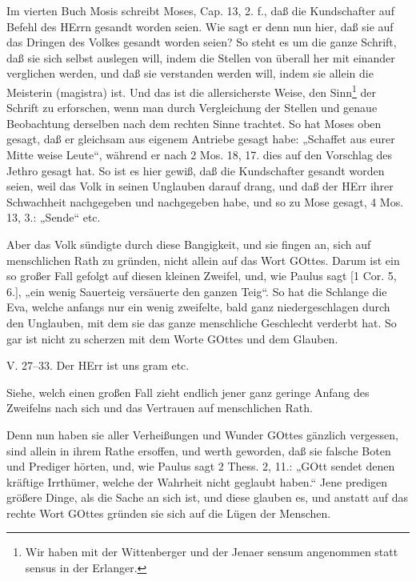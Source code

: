 Im vierten Buch Mosis schreibt Moses, Cap. 13, 2. f., daß die Kundschafter auf Befehl des HErrn gesandt worden seien. Wie sagt er denn nun hier, daß sie auf das Dringen des Volkes gesandt worden seien? So steht es um die ganze Schrift, daß sie sich selbst auslegen will, indem die Stellen von überall her mit einander verglichen werden, und daß sie verstanden werden will, indem sie allein die Meisterin (magistra) ist. Und das ist die allersicherste Weise, den Sinn\footnote{Wir haben mit der Wittenberger und der Jenaer sensum angenommen statt sensus in der Erlanger.} der Schrift zu erforschen, wenn man durch Vergleichung der Stellen und genaue Beobachtung derselben nach dem rechten Sinne trachtet. So hat Moses oben gesagt, daß er gleichsam aus eigenem Antriebe gesagt habe: „Schaffet aus eurer Mitte weise Leute“, während er nach 2 Mos. 18, 17. dies auf den Vorschlag des Jethro gesagt hat. So ist es hier gewiß, daß die Kundschafter gesandt worden seien, weil das Volk in seinen Unglauben darauf drang, und daß der HErr ihrer Schwachheit nachgegeben und nachgegeben habe, und so zu Mose gesagt, 4 Mos. 13, 3.: „Sende“ etc.

Aber das Volk sündigte durch diese Bangigkeit, und sie fingen an, sich auf menschlichen Rath zu gründen, nicht allein auf das Wort GOttes. Darum ist ein so großer Fall gefolgt auf diesen kleinen Zweifel, und, wie Paulus sagt [1 Cor. 5, 6.], „ein wenig Sauerteig versäuerte den ganzen Teig“. So hat die Schlange die Eva, welche anfangs nur ein wenig zweifelte, bald ganz niedergeschlagen durch den Unglauben, mit dem sie das ganze menschliche Geschlecht verderbt hat. So gar ist nicht zu scherzen mit dem Worte GOttes und dem Glauben.

\begin{schriftzitat}
V. 27–33. Der HErr ist uns gram etc.
\end{schriftzitat}

Siehe, welch einen großen Fall zieht endlich jener ganz geringe Anfang des Zweifelns nach sich und das Vertrauen auf menschlichen Rath.

Denn nun haben sie aller Verheißungen und Wunder GOttes gänzlich vergessen, sind allein in ihrem Rathe ersoffen, und werth geworden, daß sie falsche Boten und Prediger hörten, und, wie Paulus sagt 2 Thess. 2, 11.: „GOtt sendet denen kräftige Irrthümer, welche der Wahrheit nicht geglaubt haben.“ Jene predigen größere Dinge, als die Sache an sich ist, und diese glauben es, und anstatt auf das rechte Wort GOttes gründen sie sich auf die Lügen der Menschen.

